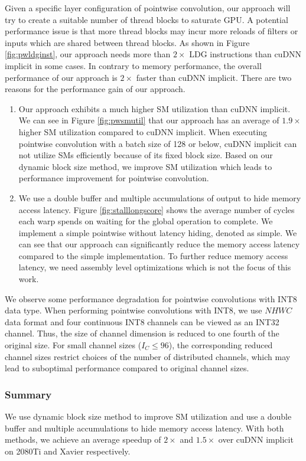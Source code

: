 Given a specific layer configuration of pointwise convolution, our approach will try to create a suitable number of thread blocks to saturate GPU. 
A potential performance issue is that more thread blocks may incur more reloads of filters or inputs which are shared between thread blocks. 
As shown in Figure \ref{fig:pwldginst}, our approach needs more than $2\times$ LDG instructions than cuDNN implicit in some cases.
In contrary to memory performance, the overall performance of our approach is $2\times$ faster than cuDNN implicit.
There are two reasons for the performance gain of our approach. 
\begin{enumerate}
	\item Our approach exhibits a much higher SM utilization than cuDNN implicit.
	We can see in Figure \ref{fig:pwsmutil} that our approach has an average of $1.9\times$ higher SM utilization compared to cuDNN implicit.
	When executing pointwise convolution with a batch size of 128 or below, cuDNN implicit can not utilize SMs efficiently because of its fixed block size. 
	Based on our dynamic block size method, we improve SM utilization which leads to performance improvement for pointwise convolution.
	\item We use a double buffer and multiple accumulations of output to hide memory access latency.
	Figure \ref{fig:stalllongscore} shows the average number of cycles each warp spends on waiting for the global operation to complete. 
	We implement a simple pointwise without latency hiding, denoted as simple. 
	We can see that our approach can significantly reduce the memory access latency compared to the simple implementation.
	To further reduce memory access latency, we need assembly level optimizations which is not the focus of this work.
\end{enumerate}

We observe some performance degradation for pointwise convolutions with INT8 data type.
When performing pointwise convolutions with INT8, we use $NHWC$ data format and four continuous INT8 channels can be viewed as an INT32 channel. 
Thus, the size of channel dimension is reduced to one fourth of the original size.
For small channel sizes ($I_C \leq 96$), the corresponding reduced channel sizes restrict  choices of the number of distributed channels, which may lead to suboptimal performance compared to original channel sizes.

\subsubsection{Summary} We use dynamic block size method to improve SM utilization and use a double buffer and multiple accumulations to hide memory access latency. With both methods, we achieve an average speedup of $2\times$ and $1.5\times$ over cuDNN implicit on 2080Ti and Xavier respectively.



